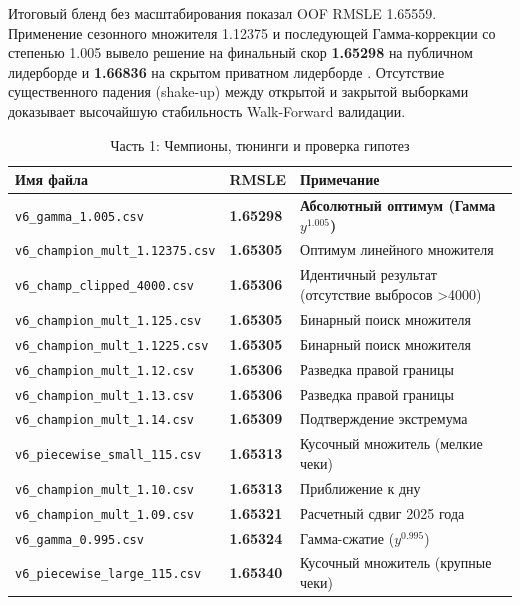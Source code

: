 \documentclass[12pt, a4paper]{article}
\newcommand{\rmsleGood}[1]{\textbf{\color{success}#1}}
\begin{document}
	Итоговый бленд без масштабирования показал OOF RMSLE 1.65559. Применение сезонного множителя 1.12375 и последующей Гамма-коррекции со степенью 1.005 вывело решение на финальный скор \textbf{1.65298} на публичном лидерборде и \textbf{1.66836} на скрытом приватном лидерборде \cite{ref:tests}. Отсутствие существенного падения (shake-up) между открытой и закрытой выборками доказывает высочайшую стабильность Walk-Forward валидации.
	
	\begin{table}[H]
		\centering\small
		\caption{Часть 1: Чемпионы, тюнинги и проверка гипотез}
		\vspace{0.2cm}
		\begin{tabular}{l l p{7cm}}
			\toprule
			\textbf{Имя файла} & \textbf{RMSLE} & \textbf{Примечание} \\
			\midrule
			\texttt{v6\_gamma\_1.005.csv} & \rmsleGood{1.65298} & \textbf{Абсолютный оптимум (Гамма $y^{1.005}$)} \\
			\texttt{v6\_champion\_mult\_1.12375.csv} & \rmsleGood{1.65305} & Оптимум линейного множителя \\
			\texttt{v6\_champ\_clipped\_4000.csv} & \rmsleGood{1.65306} & Идентичный результат (отсутствие выбросов >4000) \\
			\texttt{v6\_champion\_mult\_1.125.csv} & \rmsleGood{1.65305} & Бинарный поиск множителя \\
			\texttt{v6\_champion\_mult\_1.1225.csv} & \rmsleGood{1.65305} & Бинарный поиск множителя \\
			\texttt{v6\_champion\_mult\_1.12.csv} & \rmsleGood{1.65306} & Разведка правой границы \\
			\texttt{v6\_champion\_mult\_1.13.csv} & \rmsleGood{1.65306} & Разведка правой границы \\
			\texttt{v6\_champion\_mult\_1.14.csv} & \rmsleGood{1.65309} & Подтверждение экстремума \\
			\texttt{v6\_piecewise\_small\_115.csv} & \rmsleGood{1.65313} & Кусочный множитель (мелкие чеки) \\
			\texttt{v6\_champion\_mult\_1.10.csv} & \rmsleGood{1.65313} & Приближение к дну \\
			\texttt{v6\_champion\_mult\_1.09.csv} & \rmsleGood{1.65321} & Расчетный сдвиг 2025 года \\
			\texttt{v6\_gamma\_0.995.csv} & \rmsleGood{1.65324} & Гамма-сжатие ($y^{0.995}$) \\
			\texttt{v6\_piecewise\_large\_115.csv} & \rmsleGood{1.65340} & Кусочный множитель (крупные чеки) \\

\end{tabular}
\end{table}
\end{document}
